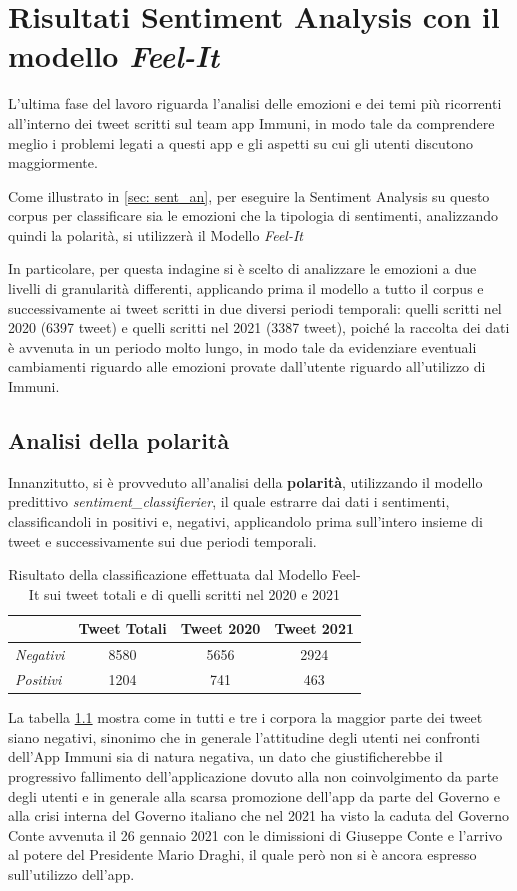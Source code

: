 \chapter{Risultati Sentiment Analysis con il modello \textit{Feel-It}}
L’ultima fase del lavoro riguarda l'analisi delle emozioni e dei temi più ricorrenti all'interno dei tweet scritti sul team app Immuni, in modo tale da comprendere meglio i problemi legati a questi app e gli aspetti su cui gli utenti discutono maggiormente.

Come illustrato in \ref{sec: sent_an}, per eseguire la Sentiment Analysis su questo corpus per classificare sia le emozioni che la tipologia di sentimenti, analizzando quindi la polarità, si utilizzerà il Modello \textit{Feel-It}

In particolare, per questa indagine si è scelto di analizzare le emozioni a due livelli di granularità differenti, applicando prima il modello a tutto il corpus e successivamente ai tweet scritti in due diversi periodi temporali: quelli scritti nel 2020 (6397 tweet) e quelli scritti nel 2021 (3387 tweet),  poiché la raccolta dei dati è avvenuta in un periodo molto lungo, in modo tale da evidenziare eventuali cambiamenti riguardo alle emozioni provate dall'utente riguardo all'utilizzo di Immuni.

\section{Analisi della polarità}
Innanzitutto, si è provveduto all'analisi della \textbf{polarità}, utilizzando il modello predittivo \textit{sentiment\_classifierier}, il quale estrarre dai dati i sentimenti, classificandoli in positivi e, negativi, applicandolo prima sull'intero insieme di tweet e successivamente sui due periodi temporali.
\begin{table}[H]
\centering
    \begin{tabular}{|l|c|c|c|}
    \hline
    \rowcolor[HTML]{DAE8FC} 
                       & \textbf{Tweet Totali} & \textbf{Tweet 2020} & \textbf{Tweet 2021} \\ \hline
    \textit{Negativi}    & 8580    & 5656  & 2924    \\ \hline
    \textit{Positivi}     & 1204   & 741   & 463                 \\ \hline
    \end{tabular}
    \caption{Risultato della classificazione effettuata dal Modello Feel-It sui tweet totali e di quelli scritti nel 2020 e 2021}
    \label{table: ris_fellit}
\end{table}
La tabella \ref{table: ris_fellit} mostra come in tutti e tre i corpora la maggior parte dei tweet siano negativi, sinonimo che in generale l'attitudine degli utenti nei confronti dell'App Immuni sia di natura negativa, un dato che giustificherebbe il progressivo fallimento dell'applicazione dovuto alla non coinvolgimento da parte degli utenti e in generale alla scarsa promozione dell'app da parte del Governo e alla crisi interna del Governo italiano che nel 2021 ha visto la caduta del Governo Conte avvenuta il 26 gennaio 2021 con le dimissioni di Giuseppe Conte e l'arrivo al potere del Presidente Mario Draghi, il quale però non si è ancora espresso sull'utilizzo dell'app.


